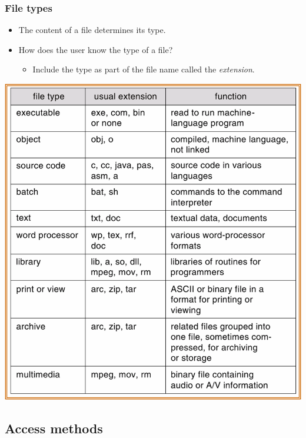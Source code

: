 \documentclass[CJKutf8,xcolor=pdftex,dvipsnames,table]{beamer}
\begin{document}
\begin{CJK*}{UTF8}{song}
  \begin{frame}
    \frametitle{File types} \pause
    \begin{itemize}
    \item The content of a file determines its type. \pause
    \item How does the user know the type of a file? \pause
      \begin{itemize}
      \item Include the type as part of the file name called the \emph{extension}.\pause
      \end{itemize}
    \end{itemize}
    \begin{center}
      \includegraphics[scale=0.4]{v6f11-1}
    \end{center}
  \end{frame}

  \subsection{Access methods}


\end{CJK*}
\end{document}
